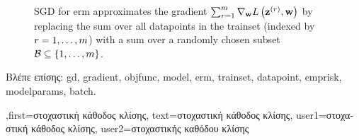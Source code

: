 {{\begin{figure}[H]
		\caption{SGD for \gls{erm} approximates the \gls{gradient} 
		$\sum_{r=1}^{m} \nabla_{{\bf w}} L\left({\bf z}^{(r)},{\bf w} \right)$ 
		by replacing the 
		sum over all \gls{datapoint}s in the \gls{trainset} (indexed by $r=1,\ldots,m$) 
		with a sum over a randomly chosen subset $\mathcal{B} \subseteq \{1,\ldots,m\}$.\label{fig_sgd_approx_dict}}
		\end{figure}
		\foreignlanguage{greek}{Βλέπε επίσης:} \gls{gd}, \gls{gradient}, \gls{objfunc}, \gls{model}, \gls{erm}, \gls{trainset}, \gls{datapoint}, \gls{emprisk}, \gls{modelparams}, \gls{batch}.
},first={\foreignlanguage{greek}{στοχαστική κάθοδος κλίσης}},
text={\foreignlanguage{greek}{στοχαστική κάθοδος κλίσης}},
user1={\foreignlanguage{greek}{στοχαστική κάθοδος κλίσης}}, %
user2={\foreignlanguage{greek}{στοχαστικής καθόδου κλίσης}} %
}

